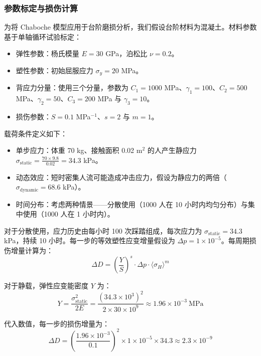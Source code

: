 \documentclass[11pt,a4paper]{ctexart}
\begin{document}
\subsubsection{参数标定与损伤计算}

为将 Chaboche 模型应用于台阶磨损分析，我们假设台阶材料为混凝土。材料参数基于单轴循环试验标定：

\begin{itemize}
\item 弹性参数：杨氏模量 $E = 30$ GPa，泊松比 $\nu = 0.2$。
\item 塑性参数：初始屈服应力 $\sigma_y = 20$ MPa。
\item 背应力分量：使用三个分量，参数为 $C_1 = 1000$ MPa、$\gamma_1 = 100$、$C_2 = 500$ MPa、$\gamma_2 = 50$、$C_3 = 200$ MPa 与 $\gamma_3 = 10$。
\item 损伤参数：$S = 0.1$ MPa$^{-1}$、$s = 2$ 与 $m = 1$。
\end{itemize}

载荷条件定义如下：

\begin{itemize}
\item 单步应力：体重 70 kg、接触面积 0.02 m$^2$ 的人产生静应力 $\sigma_{\mathrm{static}} = \frac{70\times 9.8}{0.02} = 34.3$ kPa。
\item 动态效应：短时密集人流可能造成冲击应力，假设为静应力的两倍（$\sigma_{\mathrm{dynamic}} = 68.6$ kPa）。
\item 时间分布：考虑两种情景——分散使用（1000 人在 10 小时内均匀分布）与集中使用（1000 人在 1 小时内）。
\end{itemize}

对于分散使用，应力历史由每小时 100 次踩踏组成，每次应力为 $\sigma_{\mathrm{static}} = 34.3$ kPa，持续 10 小时。每一步的等效塑性应变增量假设为 $\Delta p = 1\times 10^{-5}$。每周期损伤增量计算为：
\begin{equation*}
\Delta D = \left(\frac{Y}{S}\right)^{s}\cdot\Delta p\cdot\langle\sigma_H\rangle^{m}
\end{equation*}

对于静载，弹性应变能密度 $Y$ 为：
\begin{equation*}
Y = \frac{\sigma_{\mathrm{static}}^{2}}{2E} = \frac{(34.3\times 10^{3})^{2}}{2\times 30\times 10^{9}} \approx 1.96\times 10^{-3}\ \mathrm{MPa}
\end{equation*}

代入数值，每一步的损伤增量为：
\begin{equation*}
\Delta D = \left(\frac{1.96\times 10^{-3}}{0.1}\right)^{2}\times 1\times 10^{-5}\times 34.3 \approx 2.3\times 10^{-9}
\end{equation*}
\end{document}
